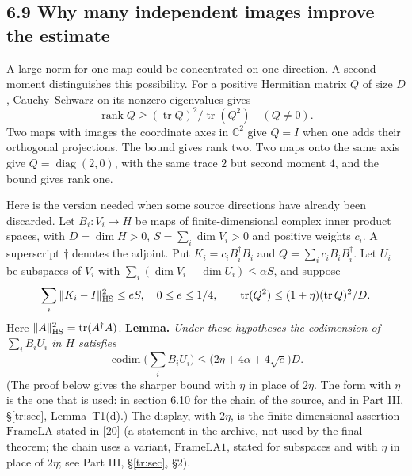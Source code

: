 \documentclass[11pt,letterpaper]{article}
\begin{document}
{\newpage
\subsection*{6.9 Why many independent images improve the estimate}

A large norm for one map could be concentrated on one direction. A second moment distinguishes this possibility. For a positive Hermitian matrix $Q$ of size $D$, Cauchy--Schwarz on its nonzero eigenvalues gives
\begin{equation}\label{D:103}
 \operatorname{rank}Q\ge (\operatorname{tr}Q)^2/\operatorname{tr}(Q^2)
 \quad (Q\ne0).
\end{equation}
Two maps with images the coordinate axes in $\mathbb C^2$ give $Q=I$ when one adds their orthogonal projections. The bound gives rank two. Two maps onto the same axis give $Q=\operatorname{diag}(2,0)$, with the same trace $2$ but second moment $4$, and the bound gives rank one.

Here is the version needed when some source directions have already been discarded. Let $B_i:V_i\to H$ be maps of finite-dimensional complex inner product spaces, with $D=\dim H>0$, $S=\sum_i\dim V_i>0$ and positive weights $c_i$. A superscript $\dagger$ denotes the adjoint. Put $K_i=c_iB_i^\dagger B_i$ and $Q=\sum_i c_i B_iB_i^\dagger$. Let $U_i$ be subspaces of $V_i$ with $\sum_i(\dim V_i-\dim U_i)\le\alpha S$, and suppose
\begin{equation}\label{D:104}
 \sum_i\|K_i-I\|_{\rm HS}^2\le e S,\quad 0\le e\le1/4,\qquad
 \operatorname{tr}(Q^2)\le(1+\eta)(\operatorname{tr}Q)^2/D.
\end{equation}
Here $\|A\|_{\rm HS}^2=\operatorname{tr}(A^\dagger A)$. \textbf{Lemma.} \textit{Under these hypotheses the codimension of $\sum_i B_i U_i$ in $H$ satisfies}
\begin{equation}\label{D:105}
 \operatorname{codim}\Big(\sum_i B_iU_i\Big)\le\big(2\eta+4\alpha+4\sqrt e\big)D .
\end{equation}
(The proof below gives the sharper bound with $\eta$ in place of $2\eta$. The form with $\eta$ is the one that is used: in section 6.10 for the chain of the source, and in Part III, \S\ref{tr:sec}, Lemma~T1(d).) The display, with $2\eta$, is the finite-dimensional assertion $\mathrm{FrameLA}$ stated in [20] (a statement in the archive, not used by the final theorem; the chain uses a variant, $\mathrm{FrameLA1}$, stated for subspaces and with $\eta$ in place of $2\eta$; see Part III, \S\ref{tr:sec}, \S2).

}
\end{document}

